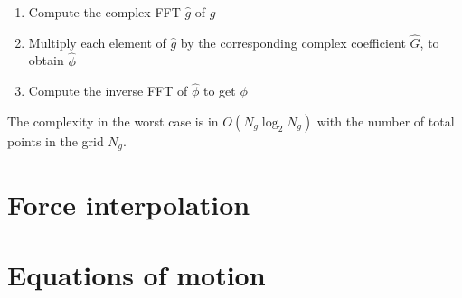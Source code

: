 %
\begin{enumerate}
\item Compute the complex FFT $\hat g$ of $g$
\item Multiply each element of $\hat g$ by the corresponding complex coefficient 
$\hat G$, to obtain $\hat \phi$
\item Compute the inverse FFT of $\hat \phi$ to get $\phi$
\end{enumerate}
%
The complexity in the worst case is in $O(N_g \log_2 N_g)$ with the number of 
total points in the grid $N_g$.

\section{Force interpolation}



\section{Equations of motion}

